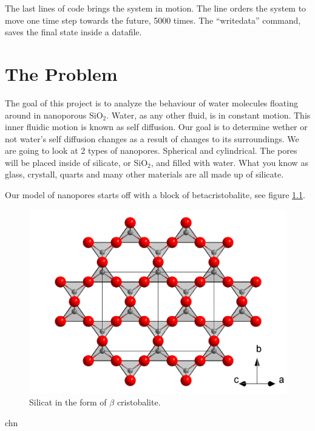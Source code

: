 \documentclass[10pt, a4paper]{report}
\begin{document}
The last lines of code brings the system in motion. The line orders the system to move one time step towards the future, 5000 times.
The ``write\textunderscore data'' command, saves the final state inside a datafile. 


\chapter{The Problem}
The goal of this project is to analyze the behaviour of water molecules floating around in nanoporous SiO$_2$. 
Water, as any other fluid, is in constant motion. This inner fluidic motion is known as self diffusion. Our goal is to determine wether
or not water's self diffusion changes as a result of changes to its surroundings. We are going to look at 2 types of nanopores. Spherical and cylindrical.
The pores will be placed inside of silicate, or SiO$_2$, and filled with water. What you know as glass, crystall, quarts and many other materials are all made up of silicate.

Our model of nanopores starts off with a block of betacristobalite, see figure \ref{fig:beta}.
\begin{figure}[h] 

 \includegraphics[scale=0.15]{beta}\centering
 \caption{\label{fig:beta}Silicat in the form of $\beta$ cristobalite. }
 
\end{figure}

chn
\end{document}
